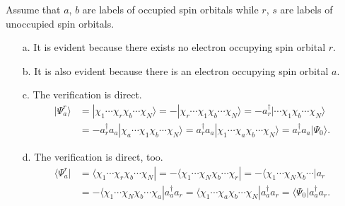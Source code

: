 \documentclass[a4paper]{book}
\newcounter{solution}[chapter]
\begin{document}
	\begin{solution}
	
	Assume that $a$, $b$ are labels of occupied spin orbitals while $r$, $s$ are labels of unoccupied spin orbitals.
	
	\begin{itemize}

	\item[a.] It is evident because there exists no electron occupying spin orbital $r$.
	
	\item[b.] It is also evident because there is an electron occupying spin orbital $a$.
	
	\item[c.] The verification is direct.
	\begin{align*}
		 | \Psi^r_a \rangle &= | \chi_1 \cdots \chi_r \chi_b \cdots \chi_N \rangle = - | \chi_r \cdots \chi_1 \chi_b \cdots \chi_N \rangle = - a^\dagger_r | \cdots \chi_1 \chi_b \cdots \chi_N \rangle \\
		 &=  - a^\dagger_r a_a | \chi_a \cdots \chi_1 \chi_b \cdots \chi_N \rangle = a^\dagger_r a_a | \chi_1 \cdots \chi_a \chi_b \cdots \chi_N \rangle = a^\dagger_r a_a | \Psi_0 \rangle .
	\end{align*}
	
	\item[d.] The verification is direct, too.
	\begin{align*}
		\langle \Psi^r_a | &= \langle \chi_1 \cdots \chi_r \chi_b \cdots \chi_N | = - \langle \chi_1 \cdots \chi_N \chi_b \cdots \chi_r | = - \langle \chi_1 \cdots \chi_N \chi_b \cdots | a_r \\
		&= -  \langle \chi_1 \cdots \chi_N \chi_b \cdots \chi_a | a^\dagger_a a_r = \langle \chi_1 \cdots \chi_a \chi_b \cdots \chi_N | a^\dagger_a a_r = \langle \Psi_0 | a^\dagger_a a_r . 
	\end{align*}
	

\end{itemize}
\end{solution}
\end{document}
